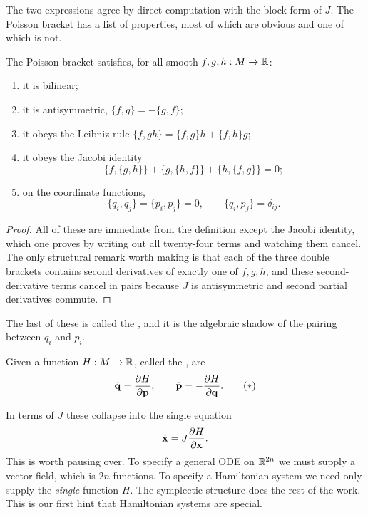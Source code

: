 \documentclass[a4paper]{scrartcl}
\begin{document}
The two expressions agree by direct computation with the block form of $J$. The Poisson bracket has a list of properties, most of which are obvious and one of which is not.

\begin{proposition}
	The Poisson bracket satisfies, for all smooth $f, g, h : M \to \mathbb{R}$:
	\begin{enumerate}[label=(\roman*)]
		\item it is bilinear;
		\item it is antisymmetric, $\{f,g\} = -\{g,f\}$;
		\item it obeys the Leibniz rule $\{f, gh\} = \{f,g\}h + \{f,h\}g$;
		\item it obeys the Jacobi identity
		$$
		\{f, \{g,h\}\} + \{g, \{h,f\}\} + \{h, \{f,g\}\} = 0;
		$$
		\item on the coordinate functions,
		$$
		\{q_i, q_j\} = \{p_i, p_j\} = 0, \qquad \{q_i, p_j\} = \delta_{ij}.
		$$
	\end{enumerate}
\end{proposition}
\begin{proof}
	All of these are immediate from the definition except the Jacobi identity, which one proves by writing out all twenty-four terms and watching them cancel. The only structural remark worth making is that each of the three double brackets contains second derivatives of exactly one of $f,g,h$, and these second-derivative terms cancel in pairs because $J$ is antisymmetric and second partial derivatives commute.
\end{proof}

The last of these is called the , and it is the algebraic shadow of the pairing between $q_i$ and $p_i$.

\begin{definition}
	Given a function $H : M \to \mathbb{R}$, called the ,  are
	\begin{equation*}
	\dot{\mathbf{q}} = \frac{\partial H}{\partial \mathbf{p}}, \qquad \dot{\mathbf{p}} = -\frac{\partial H}{\partial \mathbf{q}}. \tag{$*$}
	\end{equation*}
\end{definition}

In terms of $J$ these collapse into the single equation
$$
\dot{\mathbf{x}} = J\frac{\partial H}{\partial \mathbf{x}}.
$$
This is worth pausing over. To specify a general ODE on $\mathbb{R}^{2n}$ we must supply a vector field, which is $2n$ functions. To specify a Hamiltonian system we need only supply the \emph{single} function $H$. The symplectic structure does the rest of the work. This is our first hint that Hamiltonian systems are special.
\end{document}
